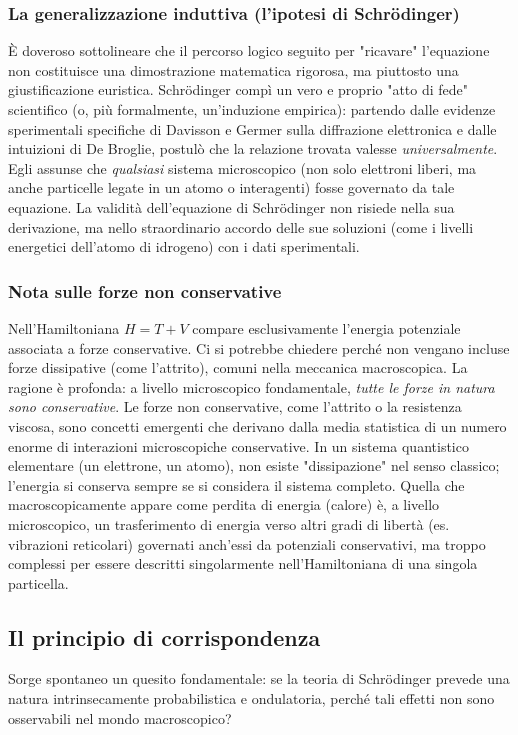 \documentclass[a4paper,11pt]{report}
\begin{document}
\subsubsection{La generalizzazione induttiva (l'ipotesi di Schrödinger)}
È doveroso sottolineare che il percorso logico seguito per "ricavare" l'equazione non costituisce una dimostrazione matematica rigorosa, ma piuttosto una giustificazione euristica.
Schrödinger compì un vero e proprio "atto di fede" scientifico (o, più formalmente, un'induzione empirica): partendo dalle evidenze sperimentali specifiche di Davisson e Germer sulla diffrazione elettronica e dalle intuizioni di De Broglie, postulò che la relazione trovata valesse \textit{universalmente}.
Egli assunse che \textit{qualsiasi} sistema microscopico (non solo elettroni liberi, ma anche particelle legate in un atomo o interagenti) fosse governato da tale equazione. La validità dell'equazione di Schrödinger non risiede nella sua derivazione, ma nello straordinario accordo delle sue soluzioni (come i livelli energetici dell'atomo di idrogeno) con i dati sperimentali.

\subsubsection{Nota sulle forze non conservative}
Nell'Hamiltoniana ${H} = {T} + {V}$ compare esclusivamente l'energia potenziale associata a forze conservative. Ci si potrebbe chiedere perché non vengano incluse forze dissipative (come l'attrito), comuni nella meccanica macroscopica.
La ragione è profonda: a livello microscopico fondamentale, \textit{tutte le forze in natura sono conservative}.
Le forze non conservative, come l'attrito o la resistenza viscosa, sono concetti emergenti che derivano dalla media statistica di un numero enorme di interazioni microscopiche conservative.
In un sistema quantistico elementare (un elettrone, un atomo), non esiste "dissipazione" nel senso classico; l'energia si conserva sempre se si considera il sistema completo. Quella che macroscopicamente appare come perdita di energia (calore) è, a livello microscopico, un trasferimento di energia verso altri gradi di libertà (es. vibrazioni reticolari) governati anch'essi da potenziali conservativi, ma troppo complessi per essere descritti singolarmente nell'Hamiltoniana di una singola particella.

\subsection{Il principio di corrispondenza}
Sorge spontaneo un quesito fondamentale: se la teoria di Schrödinger prevede una natura intrinsecamente probabilistica e ondulatoria, perché tali effetti non sono osservabili nel mondo macroscopico? \\
\end{document}
